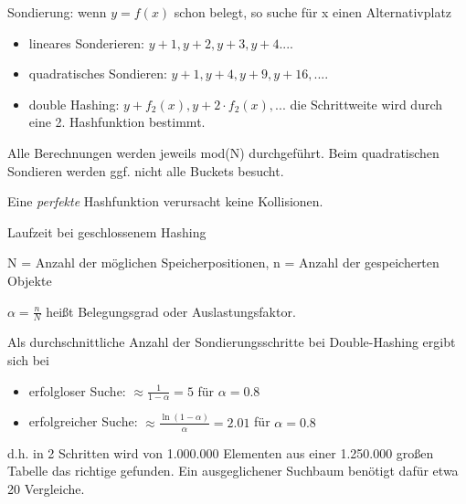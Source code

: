 \documentclass{beamer}
\begin{document}
\begin{frame}[fragile]
Sondierung: wenn $y = f(x)$ schon belegt, so suche für x einen Alternativplatz 

\begin{itemize}
\item lineares Sonderieren: $y+1, y+2, y+3, y+4 .... $ 

\item quadratisches Sondieren: \pause $y+1, y+4, y+9, y+16 , ....$  

\item double Hashing: \pause  $y + f_2(x), y + 2 \cdot f_2(x), ... $  die Schrittweite wird durch eine 2. Hashfunktion bestimmt.\pause
\end{itemize}

Alle Berechnungen werden jeweils mod(N) durchgeführt. Beim quadratischen Sondieren werden ggf. nicht alle Buckets besucht.  

Eine \textit{perfekte} Hashfunktion verursacht keine Kollisionen.

\end{frame}

\begin{frame}[fragile]
Laufzeit bei geschlossenem Hashing  

N = Anzahl der möglichen Speicherpositionen, n = Anzahl der gespeicherten Objekte

$\alpha = \frac{n}{N}$ heißt Belegungsgrad oder Auslastungsfaktor. 

Als durchschnittliche Anzahl der Sondierungsschritte bei Double-Hashing ergibt sich bei  

\begin{itemize}
\item erfolgloser Suche: $\approx \frac{1}{1-\alpha} = 5$  für $\alpha = 0.8$  
\item erfolgreicher Suche: $\approx \frac{\ln(1-\alpha)}{\alpha} = 2.01$ für $\alpha = 0.8$ \pause
\end{itemize}

d.h. in 2 Schritten wird von 1.000.000 Elementen aus einer 1.250.000 großen Tabelle das richtige gefunden. Ein ausgeglichener Suchbaum benötigt dafür etwa 20 Vergleiche. 
\end{frame}
\end{document}

